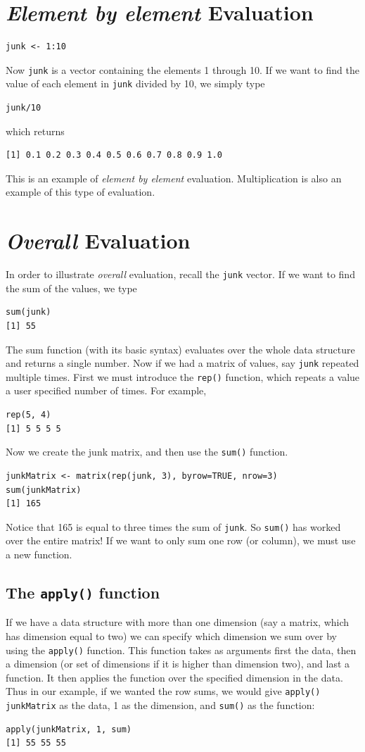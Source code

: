 \documentclass[11pt,letterpaper,fleqn]{report}
\begin{document}
\section{\emph{Element by element} Evaluation}
\begin{verbatim}
junk <- 1:10
\end{verbatim}
Now \texttt{junk} is a vector containing the elements 1 through 10. If we want to find the value of each element in \texttt{junk} divided by 10, we simply type
\begin{verbatim}
junk/10
\end{verbatim}
which returns
\begin{verbatim}
[1] 0.1 0.2 0.3 0.4 0.5 0.6 0.7 0.8 0.9 1.0
\end{verbatim}
This is an example of \emph{element by element} evaluation. Multiplication is also an example of this type of evaluation.
\section{\emph{Overall} Evaluation}In order to illustrate \emph{overall} evaluation, recall the \texttt{junk} vector. If we want to find the sum of the values, we type
\begin{verbatim}
sum(junk)
[1] 55
\end{verbatim}
The sum function (with its basic syntax) evaluates over the whole data structure and returns a single number. Now if we had a matrix of values, say \texttt{junk} repeated multiple times. First we must introduce the \texttt{rep()} function, which repeats a value a user specified number of times. For example,
\begin{verbatim}
rep(5, 4)
[1] 5 5 5 5
\end{verbatim}
Now we create the junk matrix, and then use the \texttt{sum()} function.
\begin{verbatim}
junkMatrix <- matrix(rep(junk, 3), byrow=TRUE, nrow=3)
sum(junkMatrix)
[1] 165
\end{verbatim}
Notice that 165 is equal to three times the sum of \texttt{junk}. So \texttt{sum()} has worked over the entire matrix! If we want to only sum one row (or column), we must use a new function. 
\subsection{The \texttt{apply()} function}If we have a data structure with more than one dimension (say a matrix, which has dimension equal to two) we can specify which dimension we sum over by using the \texttt{apply()} function. This function takes as arguments first the data, then a dimension (or set of dimensions if it is higher than dimension two), and last a function. It then applies the function over the specified dimension in the data. Thus in our example, if we wanted the row sums, we would give \texttt{apply()} \texttt{junkMatrix} as the data, 1 as the dimension, and \texttt{sum()} as the function:
\begin{verbatim}
apply(junkMatrix, 1, sum)
[1] 55 55 55
\end{verbatim}
\end{document}
